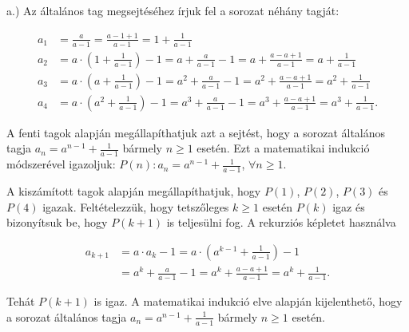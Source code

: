 \begin{solution}
a.) Az általános tag megsejtéséhez írjuk fel a sorozat néhány tagját:

\[
\begin{aligned}a_{1} & =\frac{a}{a-1}=\frac{a-1+1}{a-1}=1+\frac{1}{a-1}\\
a_{2} & =a\cdot\left(1+\frac{1}{a-1}\right)-1=a+\frac{a}{a-1}-1=a+\frac{a-a+1}{a-1}=a+\frac{1}{a-1}\\
a_{3} & =a\cdot\left(a+\frac{1}{a-1}\right)-1=a^{2}+\frac{a}{a-1}-1=a^{2}+\frac{a-a+1}{a-1}=a^{2}+\frac{1}{a-1}\\
a_{4} & =a\cdot\left(a^{2}+\frac{1}{a-1}\right)-1=a^{3}+\frac{a}{a-1}-1=a^{3}+\frac{a-a+1}{a-1}=a^{3}+\frac{1}{a-1}.
\end{aligned}
\]

A fenti tagok alapján megállapíthatjuk azt a sejtést, hogy a sorozat
általános tagja $a_{n}=a^{n-1}+\frac{1}{a-1}$ bármely $n\geq1$ esetén.
Ezt a matematikai indukció módszerével igazoljuk: $P(n):a_{n}=a^{n-1}+\frac{1}{a-1}$,
$\forall n\geq1$.

A kiszámított tagok alapján megállapíthatjuk, hogy $P(1)$, $P(2)$,
$P(3)$ és $P(4)$ igazak. Feltételezzük, hogy tetszőleges $k\geq1$
esetén $P(k)$ igaz és bizonyítsuk be, hogy $P(k+1)$ is teljesülni
fog. A rekurziós képletet használva

\[
\begin{aligned}a_{k+1} & =a\cdot a_{k}-1=a\cdot\left(a^{k-1}+\frac{1}{a-1}\right)-1\\
 & =a^{k}+\frac{a}{a-1}-1=a^{k}+\frac{a-a+1}{a-1}=a^{k}+\frac{1}{a-1}.
\end{aligned}
\]

Tehát $P(k+1)$ is igaz. A matematikai indukció elve alapján kijelenthető,
hogy a sorozat általános tagja $a_{n}=a^{n-1}+\frac{1}{a-1}$ bármely
$n\geq1$ esetén.\\


\end{solution}
